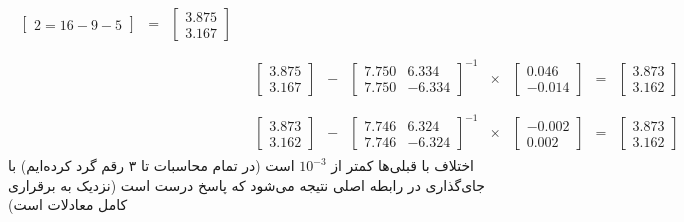 {\begin{align*}
\begin{array}{ccccccc}
\begin{bmatrix}
    2 = 16 - 9 - 5
\end{bmatrix} &= &
\begin{bmatrix}
    3.875 \\
    3.167
\end{bmatrix}
\end{array} \\
&\begin{array}{ccccccc}
 & & & & & \\
\begin{bmatrix}
    3.875 \\
    3.167
\end{bmatrix} & - & 
\begin{bmatrix}
    7.750 & 6.334 \\
    7.750 & -6.334
\end{bmatrix}^{-1} & \times &
\begin{bmatrix}
    0.046\\
    -0.014
\end{bmatrix} &= &
\begin{bmatrix}
    3.873 \\
    3.162 
\end{bmatrix}
\end{array}
\\
&\begin{array}{ccccccc}
 & & & & & \\
\begin{bmatrix}
    3.873 \\
    3.162
\end{bmatrix} & - & 
\begin{bmatrix}
    7.746 & 6.324 \\
    7.746 & -6.324
\end{bmatrix}^{-1} & \times &
\begin{bmatrix}
    -0.002 \\
    0.002
\end{bmatrix} &= &
\begin{bmatrix}
    3.873 \\
    3.162
\end{bmatrix}
\end{array}
\end{align*}
اختلاف با قبلی‌ها کمتر از
$10^{-3}$
است
(در تمام محاسبات تا ۳ رقم گرد
کرده‌ایم)
با جای‌گذاری در رابطه اصلی نتیجه می‌شود که پاسخ درست است 
(نزدیک به برقراری کامل معادلات است)
}

